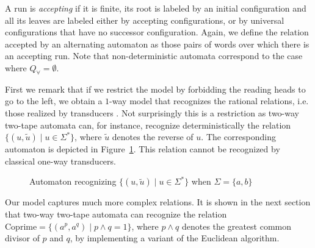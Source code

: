 \documentclass[runningheads, envcountsame, a4paper]{llncs}
\newcommand*{\ie}{i.e.\xspace}
\newcommand*{\bmark}{\vdash}
\newcommand*{\emark}{\dashv}
\newcommand*{\alphabet}{\Sigma}
\newcommand*{\goleft}{\vartriangleleft}
\newcommand*{\goright}{\vartriangleright}
\newcommand*{\stay}{\triangledown}
\newcommand*{\alphb}{\alphabet_\bmark}
\newcommand*{\reverse}[1]{\tilde{#1}}
\renewcommand*{\models}{two-way two-tape automata\xspace}
\newcommand*{\wordsof}[1]{{#1}^*}
\newcommand*{\words}{\wordsof{\alphabet}}
\newcommand*{\instruction}[4]{{#1}, {#2} \mid {#3}, {#4}}
\newcommand*{\Coprime}{\mathrm{Coprime}}
\begin{document}
A run is \emph{accepting} if it is finite, its root is labeled by an
initial configuration and all its leaves are labeled either by accepting
configurations, or by universal configurations that have no successor
configuration. Again, we define the relation accepted by an alternating
automaton as those pairs of words over which there is an accepting run.
Note that non-deterministic automata correspond to the case where
$Q_\forall = \emptyset$.

First we remark that if we restrict the model by forbidding the reading
heads to go to the left, we obtain a $1$-way model that recognizes the
rational relations, \ie those realized by transducers \cite{Sakarovitch09}.
Not surprisingly this is a restriction as \models can, for instance,
recognize deterministically the relation $\{(u, \reverse{u}) \mid u \in
\words\}$, where $\reverse{u}$ denotes the reverse of $u$.  The
corresponding automaton is depicted in Figure~\ref{reverse}.  This relation
cannot be recognized by classical one-way transducers.

\begin{figure}[ht]
  \centering
  \caption{Automaton recognizing $\{(u, \reverse{u}) \mid u \in \words\}$ when $\Sigma = \{a,b\}$}
  \label{reverse}
\end{figure}
  
Our model captures much more complex relations. It is shown in the next
section that \models can recognize the relation $\Coprime = \{(a^p, a^q)
\mid p \wedge q = 1\}$, where $p \wedge q$ denotes the greatest common
divisor of $p$ and $q$, by implementing a variant of the Euclidean
algorithm.
\end{document}
